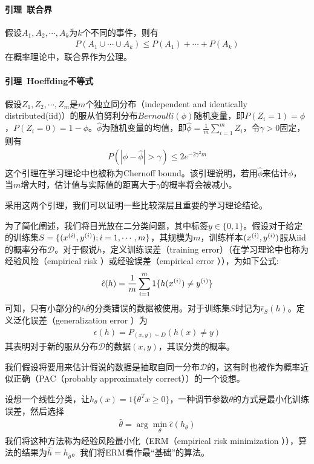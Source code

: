 \paragraph{引理\ 联合界}假设$A_1,A_2,\cdots,A_k$为$k$个不同的事件，则有
\begin{eqnarray}
P(A_1\cup\cdots\cup A_k)\leq P(A_1)+\cdots+P(A_k)
\end{eqnarray}
在概率理论中，联合界作为公理。

\paragraph{引理\ Hoeffding不等式}假设$Z_1,Z_2,\cdots,Z_m$是$m$个独立同分布（independent and identically distributed(iid)）的服从伯努利分布$Bernoulli(\phi)$随机变量，即$P(Z_i=1)=\phi$，$P(Z_i=0)=1-\phi$。$\hat{\phi}$为随机变量的均值，即$\hat{\phi}=\frac{1}{m}\sum_{i=1}^mZ_i$，令$\gamma>0$固定，则有
\begin{eqnarray}
P(|\phi-\hat{\phi}|>\gamma)\leq 2e^{-2\gamma^2m}
\end{eqnarray}
这个引理在学习理论中也被称为Chernoff bound。该引理说明，若用$\hat{\phi}$来估计$\phi$，当$m$增大时，估计值与实际值的距离大于$\gamma$的概率将会被减小。

采用这两个引理，我们可以证明一些比较深层且重要的学习理论结论。

为了简化阐述，我们将目光放在二分类问题，其中标签$y\in\{0,1\}$。假设对于给定的训练集$S=\{({x}^{({i})},{y}^{({i})});i=1,\cdots,m\}$，其规模为$m$，训练样本$({x}^{({i})},{y}^{({i})})$服从iid的概率分布$\mathcal{D}$。对于假说$h$，定义训练误差（training error）（在学习理论中也称为经验风险（empirical risk ）或经验误差（empirical error ）），为如下公式:
\begin{eqnarray}
\hat{\epsilon}(h)=\frac{1}{m}\sum_{i=1}^m1\{h({x}^{({i})})\neq{y}^{({i})}\}
\end{eqnarray}
可知，只有小部分的$h$的分类错误的数据被使用。对于训练集$S$时记为$\hat{\epsilon}_S(h)$。定义泛化误差（generalization error ）为
\begin{eqnarray}
\epsilon(h)=P_{(x,y)\sim D}(h(x)\neq y)
\end{eqnarray}
其表明对于新的服从分布$\mathcal{D}$的数据$(x,y)$，其误分类的概率。

我们假设将要用来估计假说的数据是抽取自同一分布$\mathcal{D}$的，这有时也被作为概率近似正确（PAC（probably approximately correct））的一个设想。

设想一个线性分类，让$h_\theta(x)=1\{\theta^Tx\geq0\}$，一种调节参数$\theta$的方式是最小化训练误差，然后选择
\begin{eqnarray}
\hat{\theta}=\arg\min_\theta\hat{\epsilon}(h_\theta)
\end{eqnarray}
我们将这种方法称为经验风险最小化（ERM（empirical risk minimization ）），算法的结果为$\hat{h}=h_{\hat{\theta}}$。我们将ERM看作最“基础”的算法。

